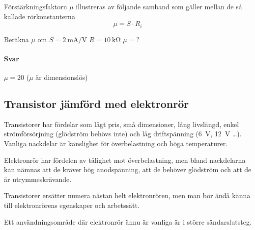 Förstärkningsfaktorn \(\mu \) illustreras av följande samband som gäller mellan
de så kallade rörkonstanterna
\[\mu = S \cdot R_i\]
\begin{exempelbox}
Beräkna \(\mu\)  om \(S = \qty{2}{\milli\ampere\per\volt}\) \(R = \qty{10}{\kilo\ohm}\) \(\mu = ?\)
\tcblower
\paragraph{Svar} \(\mu = 20\) (\(\mu\)  är dimensionslös)
\end{exempelbox}

\subsection{Transistor jämförd med elektronrör}

Transistorer har fördelar som lågt pris, små dimensioner, lång livslängd, enkel
strömförsörjning (glödström behövs inte) och låg driftspänning (\qty{6}{\volt},
\qty{12}{\volt} \ldots ).
Vanliga nackdelar är känslighet för överbelastning och höga temperaturer.

Elektronrör har fördelen av tålighet mot överbelastning, men bland nackdelarna
kan nämnas att de kräver hög anodspänning, att de behöver glödström och att de
är utrymmeskrävande.

Transistorer ersätter numera nästan helt elektronrören, men man bör ändå känna
till elektronrörens egenskaper och arbetssätt.

Ett användningsområde där elektronrör ännu är vanliga är i större
sändarslutsteg.
